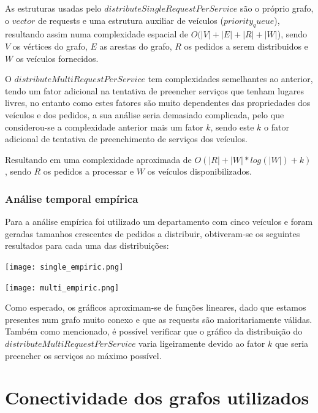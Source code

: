 \documentclass[article, a4paper, 12pt, oneside]{memoir}
\begin{document}
As estruturas usadas pelo $distributeSingleRequestPerService$ são o próprio grafo, o $vector$ de requests e uma estrutura auxiliar de veículos ($priority_queue$), resultando assim numa complexidade espacial de $O(|V|+|E|+|R|+|W|$), sendo $V$ os vértices do grafo, $E$ as arestas do grafo, $R$ os pedidos a serem distribuidos e $W$ os veículos fornecidos.

O $distributeMultiRequestPerService$ tem complexidades semelhantes ao anterior, tendo um fator adicional na tentativa de preencher serviços que tenham lugares livres, no entanto como estes fatores são muito dependentes das propriedades dos veículos e dos pedidos, a sua análise seria demasiado complicada, pelo que considerou-se a complexidade anterior mais um fator $k$, sendo este $k$ o fator adicional de tentativa de preenchimento de serviços dos veículos.

Resultando em uma complexidade aproximada de $O(|R| + |W|*log(|W|) + k)$, sendo $R$ os pedidos a processar e $W$ os veículos disponibilizados.

\subsection{Análise temporal empírica}
Para a análise empírica foi utilizado um departamento com cinco veículos e foram geradas tamanhos crescentes de pedidos a distribuir, obtiveram-se os seguintes resultados para cada uma das distribuições:

\begin{center}
\texttt{[image: single\_empiric.png]}
\end{center}

\begin{center}
\texttt{[image: multi\_empiric.png]}
\end{center}

Como esperado, os gráficos aproximam-se de funções lineares, dado que estamos presentes num grafo muito conexo e que as requests são maioritariamente válidas. Também como mencionado, é possível verificar que o gráfico da distribuição do $distributeMultiRequestPerService$ varia ligeiramente devido ao fator $k$ que seria preencher os serviços ao máximo possível.


\newpage
\chapter[Conectividade dos grafos utilizados][Conectividade dos grafos utilizados]{Conectividade dos grafos utilizados} \label{\thechapter}
\end{document}

